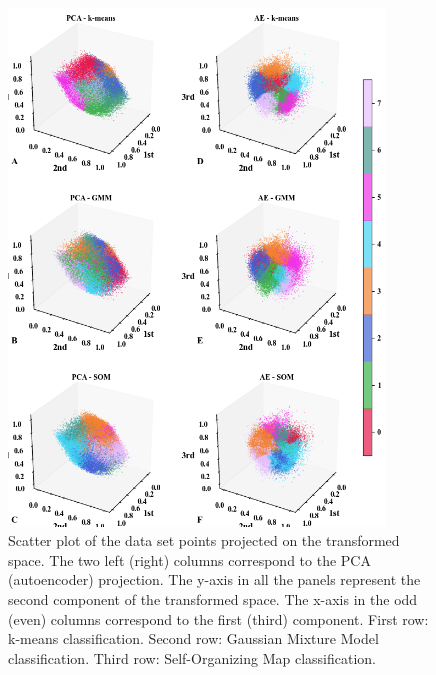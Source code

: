 \documentclass[utf8]{frontiersSCNS} %
\begin{document}
\begin{figure}[h!]
	\begin{center}
		\includegraphics[width=10cm]{Amaya/clustering}%
	\end{center}
	\caption{Scatter plot of the data set points projected on the transformed space. The two left (right) columns correspond to the PCA (autoencoder) projection. The y-axis in all the panels represent the second component of the transformed space. The x-axis in the odd (even) columns correspond to the first (third) component. First row: k-means classification. Second row: Gaussian Mixture Model classification. Third row: Self-Organizing Map classification.}\label{fig:clustering}
\end{figure}
\end{document}

